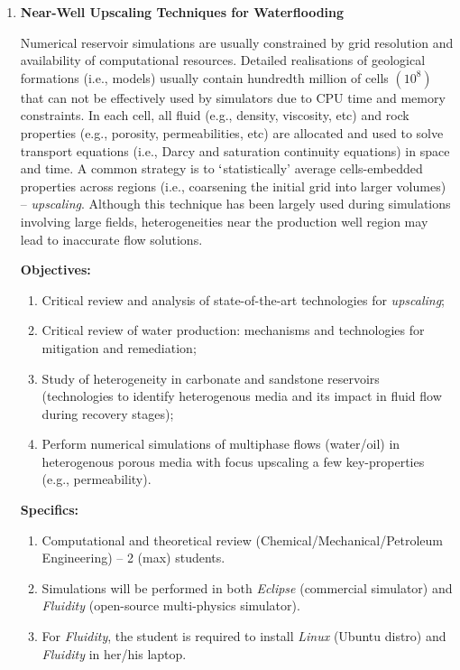 \documentclass[12pts,a4paper,amsmath,amssymb,floatfix]{article}%
\begin{document}
\begin{enumerate}[label=\bfseries Project \arabic*:]
\item {\bf Near-Well Upscaling Techniques for Waterflooding}

Numerical reservoir simulations are usually constrained by grid resolution and availability of computational resources. Detailed realisations of geological formations (i.e., models) usually contain hundredth million of cells $\left(\text{10}^{8}\right)$ that can not be effectively used by simulators due to CPU time and memory constraints.  In each cell, all fluid (e.g., density, viscosity, etc) and rock properties (e.g., porosity, permeabilities, etc) are allocated and used to solve transport equations (i.e., Darcy and saturation continuity equations) in space and time. A common strategy is to $\lq$statistically' average cells-embedded properties across regions (i.e., coarsening the initial grid into larger volumes) -- {\it upscaling}.  Although this technique has been largely used during simulations involving large fields, heterogeneities near the production well region may lead to inaccurate flow solutions. 


\noindent
{\bf Objectives:}
\begin{enumerate}
\item Critical review and analysis of state-of-the-art technologies for {\it upscaling};
\item Critical review of water production: mechanisms and technologies for mitigation and remediation;
\item Study of heterogeneity in carbonate and sandstone reservoirs (technologies to identify heterogenous media and its impact in fluid flow during recovery stages);
\item Perform numerical simulations of multiphase flows (water/oil) in heterogenous porous media with focus upscaling a few key-properties (e.g., permeability).  
\end{enumerate}

\noindent
{\bf Specifics:} 
\begin{enumerate}
\item Computational and theoretical review (Chemical/Mechanical/Petroleum Engineering) -- 2 (max) students. 
\item Simulations will be performed in both {\it Eclipse} (commercial simulator) and {\it Fluidity} (open-source multi-physics simulator). 
\item For {\it Fluidity}, the student is required to install {\it Linux} (Ubuntu distro) and {\it Fluidity} in her/his laptop. 
\end{enumerate}



\end{enumerate}
\end{document}
